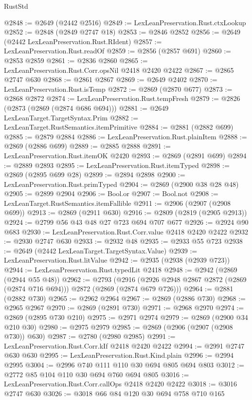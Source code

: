 \begin{lexlean}{RustStd}
\begin{coremodule}
{\begin{coremodule}
{{{{{{{{{{{{@2848 := @2649 (@2442 @2516)
@2849 := LexLeanPreservation.Rust.ctxLookup
@2852 := @2848 (@2849 @2747 @18)
@2853 := @2846 @2852
@2856 := @2649 (@2442 LexLeanPreservation.Rust.RIdent)
@2857 := LexLeanPreservation.Rust.readOf
@2859 := @2856 (@2857 @691)
@2860 := @2853 @2859
@2861 := @2836 @2860
@2865 := LexLeanPreservation.Rust.Corr.opsNil @2418 @2420 @2422
@2867 := @2865 @2747 @630
@2868 := @2861 @2867
@2869 := @2649 @2402
@2870 := LexLeanPreservation.Rust.isTemp
@2872 := @2869 (@2870 @677)
@2873 := @2868 @2872
@2874 := LexLeanPreservation.Rust.tempFresh
@2879 := @2826 (@2873 (@2869 (@2874 @686 @694)))
@2881 := @2649 LexLeanTarget.TargetSyntax.Prim
@2882 := LexLeanTarget.RustSemantics.itemPrimitive
@2884 := @2881 (@2882 @699)
@2885 := @2879 @2884
@2886 := LexLeanPreservation.Rust.plainItem
@2888 := @2869 (@2886 @699)
@2889 := @2885 @2888
@2891 := LexLeanPreservation.Rust.itemOK @2420
@2893 := @2869 (@2891 @699)
@2894 := @2889 @2893
@2895 := LexLeanPreservation.Rust.itemTyped
@2898 := @2869 (@2895 @699 @28)
@2899 := @2894 @2898
@2900 := LexLeanPreservation.Rust.primTyped
@2904 := @2869 (@2900 @38 @28 @48)
@2905 := @2899 @2904
@2906 := Bool.or
@2907 := Bool.not
@2908 := LexLeanTarget.RustSemantics.itemFallible
@2911 := @2906 (@2907 (@2908 @699))
@2913 := @2869 (@2911 @630)
@2916 := @2809 (@2819 (@2905 @2913))
@2924 := @2799 @56 @43 @48 @27 @723 @694 @707 @677
@2926 := @2924 @90 @683
@2930 := LexLeanPreservation.Rust.Corr.value @2418 @2420 @2422
@2932 := @2930 @2747 @630
@2933 := @2932 @48
@2935 := @2933 @55 @723
@2938 := @2649 (@2442 LexLeanTarget.TargetSyntax.Value)
@2939 := LexLeanPreservation.Rust.litValue
@2942 := @2935 (@2938 (@2939 @723))
@2944 := LexLeanPreservation.Rust.typedLit @2418
@2948 := @2942 (@2869 (@2944 @55 @48))
@2962 := @2793
    (@2916 (@2926 @2948 @2867 @2872 (@2869 (@2874 @716 @694))) @2872 (@2869 (@2874 @679 @726)))
@2964 := @2881 (@2882 @730)
@2965 := @2962 @2964
@2967 := @2869 (@2886 @730)
@2968 := @2965 @2967
@2970 := @2869 (@2891 @730)
@2971 := @2968 @2970
@2974 := @2869 (@2895 @730 @210)
@2975 := @2971 @2974
@2979 := @2869 (@2900 @34 @210 @30)
@2980 := @2975 @2979
@2985 := @2869 (@2906 (@2907 (@2908 @730)) @630)
@2987 := @2780 (@2980 @2985)
@2991 := LexLeanPreservation.Rust.Corr.kIf @2418 @2420 @2422
@2994 := @2991 @2747 @630 @630
@2995 := LexLeanPreservation.Rust.Kind.plain
@2996 := @2994 @2995
@3004 := @2996 @740 @111 @110 @30 @694 @805 @694 @803
@3012 := @2772 @85 @104 @110 @30 @694 @760 @694 @805
@3016 := LexLeanPreservation.Rust.Corr.callOps @2418 @2420 @2422
@3018 := @3016 @2747 @630
@3026 := @3018 @66 @84 @120 @30 @694 @758 @710 @165
}}}}}}}}}}}}
\end{coremodule}}
\end{coremodule}
\end{lexlean}
